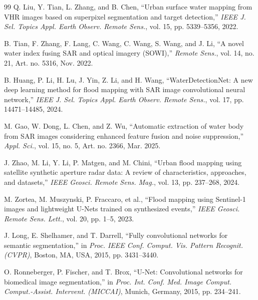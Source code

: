 \documentclass[lettersize,journal]{IEEEtran}
\begin{document}
\begin{thebibliography}{99}
Q. Liu, Y. Tian, L. Zhang, and B. Chen, ``Urban surface water mapping from VHR images based on superpixel segmentation and target detection,'' \textit{IEEE J. Sel. Topics Appl. Earth Observ. Remote Sens.}, vol. 15, pp. 5339--5356, 2022.

B. Tian, F. Zhang, F. Lang, C. Wang, C. Wang, S. Wang, and J. Li, ``A novel water index fusing SAR and optical imagery (SOWI),'' \textit{Remote Sens.}, vol. 14, no. 21, Art. no. 5316, Nov. 2022.

B. Huang, P. Li, H. Lu, J. Yin, Z. Li, and H. Wang, ``WaterDetectionNet: A new deep learning method for flood mapping with SAR image convolutional neural network,'' \textit{IEEE J. Sel. Topics Appl. Earth Observ. Remote Sens.}, vol. 17, pp. 14471--14485, 2024.

M. Gao, W. Dong, L. Chen, and Z. Wu, ``Automatic extraction of water body from SAR images considering enhanced feature fusion and noise suppression,'' \textit{Appl. Sci.}, vol. 15, no. 5, Art. no. 2366, Mar. 2025.

J. Zhao, M. Li, Y. Li, P. Matgen, and M. Chini, ``Urban flood mapping using satellite synthetic aperture radar data: A review of characteristics, approaches, and datasets,'' \textit{IEEE Geosci. Remote Sens. Mag.}, vol. 13, pp. 237--268, 2024.

M. Zortea, M. Muszynski, P. Fraccaro, et al., ``Flood mapping using Sentinel-1 images and lightweight U-Nets trained on synthesized events,'' \textit{IEEE Geosci. Remote Sens. Lett.}, vol. 20, pp. 1--5, 2023.

J. Long, E. Shelhamer, and T. Darrell, ``Fully convolutional networks for semantic segmentation,'' in \textit{Proc. IEEE Conf. Comput. Vis. Pattern Recognit. (CVPR)}, Boston, MA, USA, 2015, pp. 3431--3440.

O. Ronneberger, P. Fischer, and T. Brox, ``U-Net: Convolutional networks for biomedical image segmentation,'' in \textit{Proc. Int. Conf. Med. Image Comput. Comput.-Assist. Intervent. (MICCAI)}, Munich, Germany, 2015, pp. 234--241.


\end{thebibliography}
\end{document}
